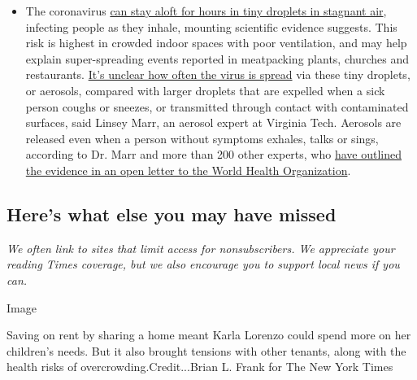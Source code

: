 \begin{itemize}
  \begin{itemize}
  \tightlist
  \item
    The coronavirus
    \href{https://www.nytimes3xbfgragh.onion/2020/07/04/health/239-experts-with-one-big-claim-the-coronavirus-is-airborne.html?action=click\&pgtype=Article\&state=default\&region=MAIN_CONTENT_3\&context=storylines_faq}{can
    stay aloft for hours in tiny droplets in stagnant air}, infecting
    people as they inhale, mounting scientific evidence suggests. This
    risk is highest in crowded indoor spaces with poor ventilation, and
    may help explain super-spreading events reported in meatpacking
    plants, churches and restaurants.
    \href{https://www.nytimes3xbfgragh.onion/2020/07/06/health/coronavirus-airborne-aerosols.html?action=click\&pgtype=Article\&state=default\&region=MAIN_CONTENT_3\&context=storylines_faq}{It's
    unclear how often the virus is spread} via these tiny droplets, or
    aerosols, compared with larger droplets that are expelled when a
    sick person coughs or sneezes, or transmitted through contact with
    contaminated surfaces, said Linsey Marr, an aerosol expert at
    Virginia Tech. Aerosols are released even when a person without
    symptoms exhales, talks or sings, according to Dr. Marr and more
    than 200 other experts, who
    \href{https://academic.oup.com/cid/article/doi/10.1093/cid/ciaa939/5867798}{have
    outlined the evidence in an open letter to the World Health
    Organization}.
  \end{itemize}
\end{itemize}

\hypertarget{heres-what-else-you-may-have-missed}{%
\subsection{Here's what else you may have
missed}\label{heres-what-else-you-may-have-missed}}

\emph{We often link to sites that limit access for nonsubscribers. We
appreciate your reading Times coverage, but we also encourage you to
support local news if you can.}

Image

Saving on rent by sharing a home meant Karla Lorenzo could spend more on
her children's needs. But it also brought tensions with other tenants,
along with the health risks of overcrowding.Credit...Brian L. Frank for
The New York Times


